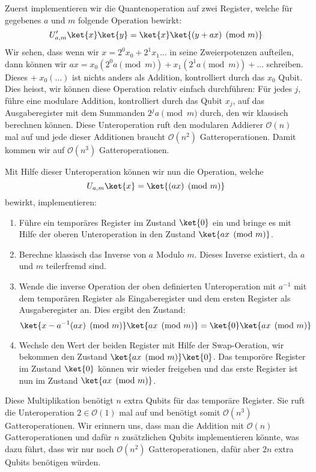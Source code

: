 Zuerst implementieren wir die Quantenoperation auf zwei Register, welche für gegebenes $a$ und $m$ folgende Operation bewirkt: $$U'_{a, m}\ket{x}\ket{y} = \ket{x}\ket{(y + ax) \pmod{m}}$$
Wir sehen, dass wenn wir $x = 2^0 x_0 + 2^1 x_1 ...$ in seine Zweierpotenzen aufteilen, dann können wir $ax = x_0(2^0 a \pmod{m}) + x_1(2^1 a \pmod{m}) + ...$ schreiben. Dieses $+ \;x_0(...)$ ist nichts anders als Addition, kontrolliert durch das $x_0$ Qubit. Dies heisst, wir können diese Operation relativ einfach durchführen: \newline
Für jedes $j$, führe eine modulare Addition, kontrolliert durch das Qubit $x_j$, auf das Ausgaberegister mit dem Summanden $2^ja \pmod{m}$ durch, den wir klassisch berechnen können. \newline
Diese Unteroperation ruft den modularen Addierer $\mathcal O(n)$ mal auf und jede dieser Additionen braucht $\mathcal O(n^2)$ Gatteroperationen. Damit kommen wir auf $\mathcal O(n^3)$ Gatteroperationen.

Mit Hilfe dieser Unteroperation können wir nun die Operation, welche $$U_{a, m}\ket{x} = \ket{(ax) \pmod{m}}$$ bewirkt, implementieren:
\begin{enumerate}
    \item Führe ein temporäres Register im Zustand $\ket{0}$ ein und bringe es mit Hilfe der oberen Unteroperation in den Zustand $\ket{ax \pmod{m}}$.
    \item Berechne klassisch das Inverse von $a$ Modulo $m$. Dieses Inverse existiert, da $a$ und $m$ teilerfremd sind.
    \item Wende die inverse Operation der oben definierten Unteroperation mit $a^{-1}$ mit dem temporären Register als Eingaberegister und dem ersten Register als Ausgaberegister an. Dies ergibt den Zustand: $$\ket{x - a^{-1}(ax) \pmod{m}}\ket{ax \pmod{m}} = \ket{0}\ket{ax \pmod{m}}$$
    \item Wechsle den Wert der beiden Register mit Hilfe der Swap-Oeration, wir bekommen den Zustand $\ket{ax \pmod{m}}\ket{0}$. Das temporöre Register im Zustand $\ket{0}$ können wir wieder freigeben und das erste Register ist nun im Zustand $\ket{ax \pmod{m}}$.
\end{enumerate}
Diese Multiplikation benötigt $n$ extra Qubits für das temporäre Register. Sie ruft die Unteroperation $2 \in \mathcal O(1)$ mal auf und benötigt somit $\mathcal O(n^3)$ Gatteroperationen. Wir erinnern uns, dass man die Addition mit $\mathcal O(n)$ Gatteroperationen und dafür $n$ zusätzlichen Qubits implementieren könnte, was dazu führt, dass wir nur noch $\mathcal O(n^2)$ Gatteroperationen, dafür aber $2n$ extra Qubits benötigen würden.